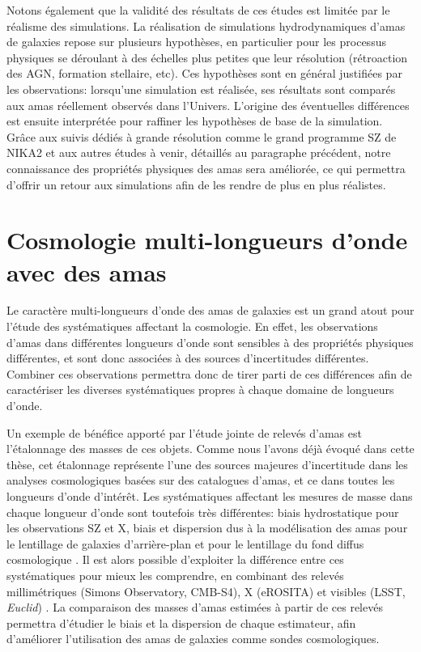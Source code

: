 Notons également que la validité des résultats de ces études est limitée par le réalisme des simulations.
La réalisation de simulations hydrodynamiques d'amas de galaxies repose sur plusieurs hypothèses, en particulier pour les processus physiques se déroulant à des échelles plus petites que leur résolution (rétroaction des AGN, formation stellaire, etc).
Ces hypothèses sont en général justifiées par les observations: lorsqu'une simulation est réalisée, ses résultats sont comparés aux amas réellement observés dans l'Univers.
L'origine des éventuelles différences est ensuite interprétée pour raffiner les hypothèses de base de la simulation.
Grâce aux suivis dédiés à grande résolution comme le grand programme SZ de NIKA2 et aux autres études à venir, détaillés au paragraphe précédent, notre connaissance des propriétés physiques des amas sera améliorée, ce qui permettra d'offrir un retour aux simulations afin de les rendre de plus en plus réalistes.

\section*{Cosmologie multi-longueurs d'onde avec des amas}

Le caractère multi-longueurs d'onde des amas de galaxies est un grand atout pour l'étude des systématiques affectant la cosmologie.
En effet, les observations d'amas dans différentes longueurs d'onde sont sensibles à des propriétés physiques différentes, et sont donc associées à des sources d'incertitudes différentes.
Combiner ces observations permettra donc de tirer parti de ces différences afin de caractériser les diverses systématiques propres à chaque domaine de longueurs d'onde.

Un exemple de bénéfice apporté par l'étude jointe de relevés d'amas est l'étalonnage des masses de ces objets.
Comme nous l'avons déjà évoqué dans cette thèse, cet étalonnage représente l'une des sources majeures d'incertitude dans les analyses cosmologiques basées sur des catalogues d'amas, et ce dans toutes les longueurs d'onde d'intérêt.
Les systématiques affectant les mesures de masse dans chaque longueur d'onde sont toutefois très différentes: biais hydrostatique pour les observations SZ et X, biais et dispersion dus à la modélisation des amas pour le lentillage de galaxies d'arrière-plan \cite{grandis_calibration_2021,sommer_weak_2021} et pour le lentillage du fond diffus cosmologique \cite{zubeldia_cosmological_2019}.
Il est alors possible d'exploiter la différence entre ces systématiques pour mieux les comprendre, en combinant des relevés millimétriques (Simons Observatory, CMB-S4), X (eROSITA) et visibles (LSST, \textit{Euclid}) \cite{rhodes_scientific_2017,dodelson_cosmic_2016}.
La comparaison des masses d'amas estimées à partir de ces relevés permettra d'étudier le biais et la dispersion de chaque estimateur, afin d'améliorer l'utilisation des amas de galaxies comme sondes cosmologiques.

